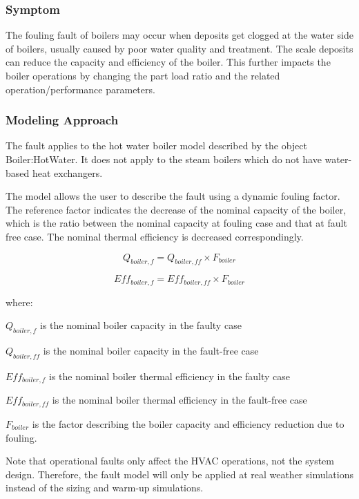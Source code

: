 \subsubsection{Symptom}

The fouling fault of boilers may occur when deposits get clogged at the water side of boilers, usually caused by poor water quality and treatment. The scale deposits can reduce the capacity and efficiency of the boiler. This further impacts the boiler operations by changing the part load ratio and the related operation/performance parameters.

\subsubsection{Modeling Approach}

The fault applies to the hot water boiler model described by the object Boiler:HotWater. It does not apply to the steam boilers which do not have water-based heat exchangers.

The model allows the user to describe the fault using a dynamic fouling factor. The reference factor indicates the decrease of the nominal capacity of the boiler, which is the ratio between the nominal capacity at fouling case and that at fault free case. The nominal thermal efficiency is decreased correspondingly.

\begin{equation}
Q_{boiler,f} = Q_{boiler,ff} \times F_{boiler}
\end{equation}

\begin{equation}
Eff_{boiler,f} = Eff_{boiler,ff} \times F_{boiler}
\end{equation}

where:

\(Q_{boiler,f}\) is the nominal boiler capacity in the faulty case

\(Q_{boiler,ff}\) is the nominal boiler capacity in the fault-free case

\(Eff_{boiler,f}\) is the nominal boiler thermal efficiency in the faulty case

\(Eff_{boiler,ff}\) is the nominal boiler thermal efficiency in the fault-free case

\(F_{boiler}\) is the factor describing the boiler capacity and efficiency reduction due to fouling.

Note that operational faults only affect the HVAC operations, not the system design. Therefore, the fault model will only be applied at real weather simulations instead of the sizing and warm-up simulations.


